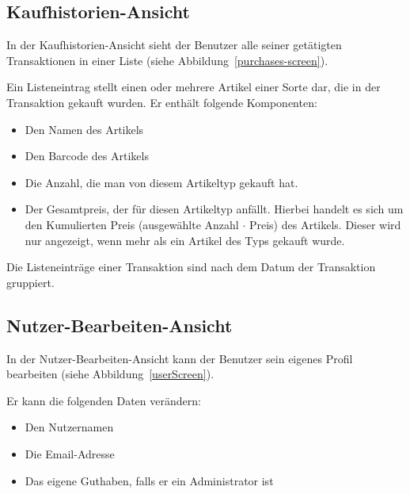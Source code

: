
\subsection{Kaufhistorien-Ansicht} \label{subsec:purchases-screen}

In der Kaufhistorien-Ansicht sieht der Benutzer alle seiner getätigten Transaktionen in einer Liste (siehe Abbildung~\ref{purchases-screen}).

Ein Listeneintrag stellt einen oder mehrere Artikel einer Sorte dar, die in der Transaktion gekauft wurden.
Er enthält folgende Komponenten:

\begin{itemize}
	\item Den Namen des Artikels

	\item Den Barcode des Artikels

	\item Die Anzahl, die man von diesem Artikeltyp gekauft hat.

	\item Der Gesamtpreis, der für diesen Artikeltyp anfällt.
	Hierbei handelt es sich um den Kumulierten Preis (ausgewählte Anzahl $\cdot$ Preis) des Artikels.
	Dieser wird nur angezeigt, wenn mehr als ein Artikel des Typs gekauft wurde.
\end{itemize}

Die Listeneinträge einer Transaktion sind nach dem Datum der Transaktion gruppiert.


\subsection{Nutzer-Bearbeiten-Ansicht} \label{subsec:edit-user-screen}

In der Nutzer-Bearbeiten-Ansicht kann der Benutzer sein eigenes Profil bearbeiten (siehe Abbildung~\ref{userScreen}).


Er kann die folgenden Daten verändern:

\begin{itemize}
	\item Den Nutzernamen
	\item Die Email-Adresse
	\item Das eigene Guthaben, falls er ein Administrator ist
\end{itemize}


